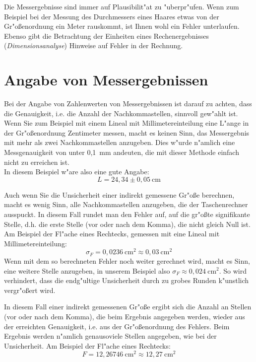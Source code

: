 Die Messergebnisse sind immer auf Plausibilit"at zu "uberpr"ufen. Wenn zum Beispiel bei der Messung des Durchmessers eines Haares etwas von der Gr"o{\ss}enordnung ein Meter rauskommt, ist Ihnen wohl ein Fehler unterlaufen. Ebenso gibt die Betrachtung der Einheiten eines Rechenergebnisses (\textit{Dimensionsanalyse}) Hinweise auf Fehler in der Rechnung. 

\section{Angabe von Messergebnissen}

Bei der Angabe von Zahlenwerten von Messergebnissen ist darauf zu achten, dass die Genauigkeit, i.e. die Anzahl der Nachkommastellen, sinnvoll gew"ahlt ist. Wenn Sie zum Beispiel mit einem Lineal mit Millimetereinteilung eine L"ange in der Gr"o{\ss}enordnung Zentimeter messen, macht es keinen Sinn, das Messergebnis mit mehr als zwei Nachkommastellen anzugeben. Dies w"urde n"amlich eine Messgenauigkeit von unter 0,1~mm andeuten, die mit dieser Methode einfach nicht zu erreichen ist.\\
In diesem Beispiel w"are also eine gute Angabe:
\begin{equation*}
	L = 24,34 \pm 0,05~\mathrm{cm}
\end{equation*}

Auch wenn Sie die Unsicherheit einer indirekt gemessene Gr"o{\ss}e berechnen, macht es wenig Sinn, alle Nachkommastellen anzugeben, die der Taschenrechner ausspuckt. In diesem Fall rundet man den Fehler auf, auf die gr"o{\ss}te signifikante Stelle, d.h. die erste Stelle (vor oder nach dem Komma), die nicht gleich Null ist. Am Beispiel der Fl"ache eines Rechtecks, gemessen mit eine Lineal mit Millimetereinteilung:
\begin{equation*}
	\sigma_F = 0,0236~\mathrm{cm^2} \approx 0,03~\mathrm{cm^2}
\end{equation*}
Wenn mit dem so berechneten Fehler noch weiter gerechnet wird, macht es Sinn, eine weitere Stelle anzugeben, in unserem Beispiel also $\sigma_F\approx 0,024~\mathrm{cm^2}$. So wird verhindert, dass die endg"ultige Unsicherheit durch zu grobes Runden k"unstlich vergr"o{\ss}ert wird.

In diesem Fall einer indirekt gemessenen Gr"o{\ss}e ergibt sich die Anzahl an Stellen (vor oder nach dem Komma), die beim Ergebnis angegeben werden, wieder aus der erreichten Genauigkeit, i.e. aus der Gr"o{\ss}enordnung des Fehlers. Beim Ergebnis werden n"amlich genausoviele Stellen angegeben, wie bei der Unsicherheit. Am Beispiel der Fl"ache eines Rechtecks:
\begin{equation*}
	F = 12,26746~\mathrm{cm^2} \approx 12,27~\mathrm{cm^2}
\end{equation*}

